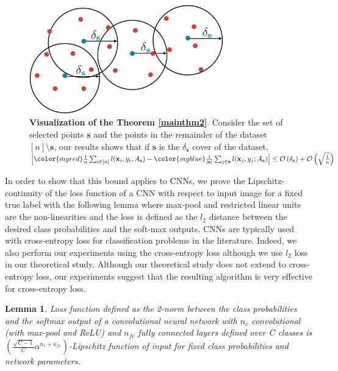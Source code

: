 \documentclass{article} %
\newtheorem{lemma}{Lemma}
\begin{document}
\begin{figure}[t]
\vspace{-5mm}
    \begin{center} \includegraphics[width=0.75\textwidth]{thm.pdf} \end{center} 
        \caption{\textbf{Visualization of the Theorem \ref{mainthm2}}. Consider the set of selected points
        {\color{myblue} $\mathbf{s}$} and the points in the remainder of the dataset {\color{myred} $[n] \setminus
        \mathbf{s}$}, our results shows that if $\mathbf{s}$ is the $\delta_{\mathbf{s}}$ cover of the dataset, 
        $\left| {\color{myred} \frac{1}{n}\sum_{i \in [n]} l(\mathbf{x}_i,y_i,A_{\mathbf{s}})} -{\color{myblue} \frac{1}{|\mathbf{s}|}\sum_{j \in
        \mathbf{s}} l(\mathbf{x}_j,y_j;A_{\mathbf{s}})}
    \right| \leq \mathcal{O}\left(\delta_\mathbf{s}\right) + \mathcal{O}\left(\sqrt{\frac{1}{n}}\right)$}
    \label{fig:thm}
    \end{figure}

In order to show that this bound applies to CNNs, we prove the Lipschitz-continuity of the loss function of a CNN with respect to input image for a fixed true label with the following lemma where max-pool and restricted linear units are the non-linearities and the loss is defined as the $l_2$ distance between the desired class probabilities and the soft-max outputs. CNNs are typically used with cross-entropy loss for classification problems in the literature. Indeed, we also perform our experiments using the cross-entropy loss although we use $l_2$ loss in our theoretical study. Although our theoretical study does not extend to cross-entropy loss, our experiments suggest that the resulting algorithm is very effective for cross-entropy loss.

\begin{lemma} 
Loss function defined as the 2-norm between the class
probabilities and the softmax output of a convolutional neural network with $n_c$ convolutional (with max-pool and ReLU) and $n_{fc}$ fully connected layers defined over C classes is $\left(\frac{\sqrt{C-1}}{C} \alpha^{n_c+n_{fc}}\right)$-Lipschitz function of input for fixed class probabilities and network parameters. \end{lemma}
\end{document}
